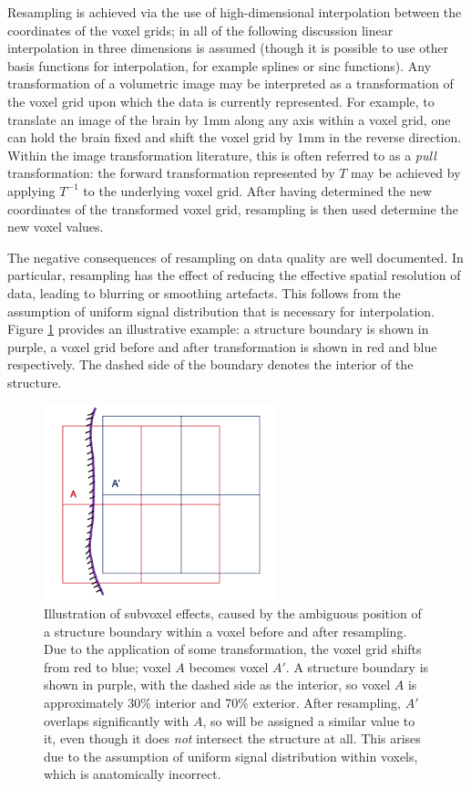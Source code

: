 \documentclass[12pt]{report}
\providecommand{\DIFaddtex}[1]{{\protect\color{blue}\uwave{#1}}} %
\providecommand{\DIFaddbegin}{} %
\providecommand{\DIFaddend}{} %
\providecommand{\DIFadd}[1]{\texorpdfstring{\DIFaddtex{#1}}{#1}} %
\newcommand{\DIFaddincludegraphics}[2][]{{\color{blue}\fbox{\DIFOincludegraphics[#1]{#2}}}} %
\DeclareRobustCommand{\DIFaddbegin}{\DIFOaddbegin \let\includegraphics\DIFaddincludegraphics} %
\DeclareRobustCommand{\DIFaddend}{\DIFOaddend \let\includegraphics\DIFOincludegraphics} %
\begin{document}
Resampling is achieved via the use of high-dimensional interpolation between the coordinates of the voxel grids; in all of the following discussion linear interpolation in three dimensions is assumed (though it is possible to use other basis functions for interpolation, for example splines or sinc functions). Any transformation of a volumetric image may be interpreted as a transformation of the voxel grid upon which the data is currently represented. For example, to translate an image of the brain by 1mm along any axis within a voxel grid, one can hold the brain fixed and shift the voxel grid by 1mm in the reverse direction. Within the image transformation literature, this is often referred to as a \textit{pull} transformation: the forward transformation represented by $T$ may be achieved by applying $T^{-1}$ to the underlying voxel grid. After having determined the new coordinates of the transformed voxel grid, resampling is then used determine the new voxel values. 

The negative consequences of resampling on data quality are well documented. In particular, resampling has the effect of reducing the effective spatial resolution of data, leading to blurring or smoothing artefacts. This follows from the assumption of uniform signal distribution that is necessary for interpolation. Figure \ref{resamp_demo} provides an illustrative example: a structure boundary is shown in purple, \DIFaddbegin \DIFadd{and }\DIFaddend a voxel grid before and after transformation is shown in red and blue respectively. The dashed side of the boundary denotes the interior of the structure. 

\begin{figure}
\centering
\includegraphics[width = 0.6\textwidth]{resamp_demo.png}
\caption{Illustration of subvoxel effects, caused by the ambiguous position of a structure boundary within a voxel before and after resampling. Due to the application of some transformation, the voxel grid shifts from red to blue; voxel $A$ becomes voxel $A'$. A structure boundary is shown in purple, with the dashed side as the interior, so voxel $A$ is approximately 30\% interior and 70\% exterior. After resampling, $A'$ overlaps significantly with $A$, so will be assigned a similar value to it, even though it does \textit{not} intersect the structure at all. This arises due to the assumption of uniform signal distribution within voxels, which is anatomically incorrect.}
\label{resamp_demo}
\end{figure}
\end{document}
